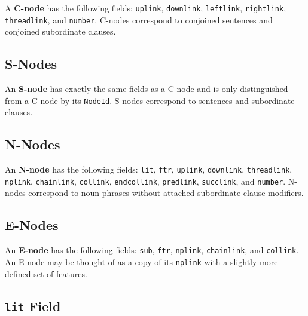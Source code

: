 \documentclass{article}
\begin{document}
A \textbf{C-node} has the following fields: \texttt{uplink},
\texttt{downlink}, \texttt{leftlink}, \texttt{rightlink},
\texttt{threadlink}, and \texttt{number}. C-nodes correspond to
conjoined sentences and conjoined subordinate clauses.


\subsection{S-Nodes}

An \textbf{S-node} has exactly the same fields as a C-node and
is only distinguished from a C-node by its
\texttt{NodeId}. S-nodes correspond to sentences and subordinate
clauses.


\subsection{N-Nodes}

An \textbf{N-node} has the following fields: \texttt{lit},
\texttt{ftr}, \texttt{uplink}, \texttt{downlink},
\texttt{threadlink}, \texttt{nplink}, \texttt{chainlink},
\texttt{collink}, \texttt{endcollink}, \texttt{predlink},
\texttt{succlink}, and \texttt{number}. N-nodes correspond to
noun phrases without attached subordinate clause modifiers.


\subsection{E-Nodes}

An \textbf{E-node} has the following fields: \texttt{sub},
\texttt{ftr}, \texttt{nplink}, \texttt{chainlink}, and
\texttt{collink}. An E-node may be thought of as a copy of its
\texttt{nplink} with a slightly more defined set of features.


\subsection{\textbf{\texttt{lit}} Field}
\end{document}
